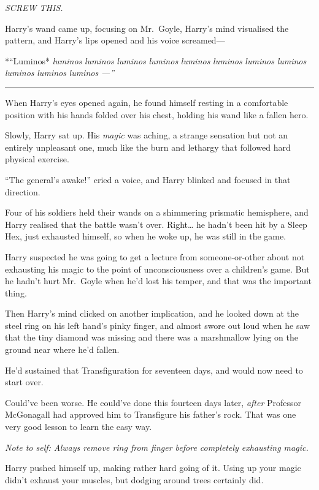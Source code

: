 \emph{SCREW THIS.}

Harry's wand came up, focusing on Mr.~Goyle, Harry's mind visualised the
pattern, and Harry's lips opened and his voice screamed---

*``Luminos* \emph{luminos} \emph{luminos} \emph{luminos} \emph{luminos}
\emph{luminos} \emph{luminos} \emph{luminos} \emph{luminos}
\emph{luminos} \emph{luminos} \emph{luminos} \emph{---''}

\begin{center}\rule{3in}{0.4pt}\end{center}

When Harry's eyes opened again, he found himself resting in a
comfortable position with his hands folded over his chest, holding his
wand like a fallen hero.

Slowly, Harry sat up. His \emph{magic} was aching, a strange sensation
but not an entirely unpleasant one, much like the burn and lethargy that
followed hard physical exercise.

``The general's awake!'' cried a voice, and Harry blinked and focused in
that direction.

Four of his soldiers held their wands on a shimmering prismatic
hemisphere, and Harry realised that the battle wasn't over.
Right\ldots{} he hadn't been hit by a Sleep Hex, just exhausted himself,
so when he woke up, he was still in the game.

Harry suspected he was going to get a lecture from someone-or-other
about not exhausting his magic to the point of unconsciousness over a
children's game. But he hadn't hurt Mr.~Goyle when he'd lost his temper,
and that was the important thing.

Then Harry's mind clicked on another implication, and he looked down at
the steel ring on his left hand's pinky finger, and almost swore out
loud when he saw that the tiny diamond was missing and there was a
marshmallow lying on the ground near where he'd fallen.

He'd sustained that Transfiguration for seventeen days, and would now
need to start over.

Could've been worse. He could've done this fourteen days later,
\emph{after} Professor McGonagall had approved him to Transfigure his
father's rock. That was one very good lesson to learn the easy way.

\emph{Note to self: Always remove ring from finger before completely
exhausting magic.}

Harry pushed himself up, making rather hard going of it. Using up your
magic didn't exhaust your muscles, but dodging around trees certainly
did.

